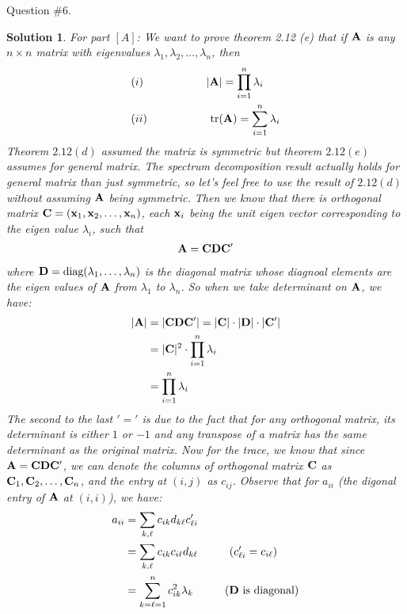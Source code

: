 \documentclass[11pt]{article}\usepackage[]{graphicx}\usepackage[]{color}
\newtheorem{sol}{Solution}
\begin{document}
Question $\# 6$.
\begin{sol}
	For part $[A]$:\vskip 2mm
	We want to prove theorem 2.12 (e) that if ${\bf A}$ is any $n \times n$ matrix with eigenvalues $\lambda_1, \lambda_2, \ldots, \lambda_n$, then 
	\begin{align*}
		&(i) \hskip 2cm |{\bf A}| = \prod_{i = 1}^n\lambda_i\\
		&(ii) \hskip 2cm \text{tr}({\bf A}) = \sum_{i = 1}^{n}\lambda_i
	\end{align*}
	Theorem $2.12(d)$ assumed the matrix is symmetric but theorem $2.12(e)$ assumes for general matrix. The spectrum decomposition result actually holds for general matrix than just symmetric, so let's feel free to use the result of $2.12(d)$ without assuming ${\bf A}$ being symmetric.\vskip 2mm
	Then we know that there is orthogonal matrix ${\bf C} = ({\bf x}_1, {\bf x}_2, \ldots, {\bf x}_n)$, each ${\bf x}_i$ being the unit eigen vector corresponding to the eigen value $\lambda_i$, such that
	\begin{align*}
		{\bf A} = {\bf C}{\bf D}{\bf C}'
	\end{align*}
	where ${\bf D} = \text{diag}(\lambda_1, \ldots, \lambda_n)$ is the diagonal matrix whose diagnoal elements are the eigen values of ${\bf A}$ from $\lambda_1$ to $\lambda_n$.\vskip 2mm
	So when we take determinant on ${\bf A}$, we have:
	\begin{align*}
		|{\bf A}| &= |{\bf C}{\bf D}{\bf C}'| = |{\bf C}|\cdot |{\bf D}|\cdot |{\bf C}'|\\
		&= |{\bf C}|^2\cdot \prod_{i = 1}^n\lambda_i\\
		&= \prod_{i = 1}^n\lambda_i
	\end{align*}
	The second to the last $'='$ is due to the fact that for any orthogonal matrix, its determinant is either $1$ or $-1$ and any transpose of a matrix has the same determinant as the original matrix.\vskip 2mm
	Now for the trace, we know that since ${\bf A} = {\bf C}{\bf D}{\bf C}'$, we can denote the columns of orthogonal matrix ${\bf C}$ as ${\bf C}_1, {\bf C}_2, \ldots, {\bf C}_n$, and the entry at $(i ,j)$ as $c_{ij}$. Observe that for $a_{ii}$ (the digonal entry of ${\bf A}$ at $(i, i)$), we have:
	\begin{align*}
		a_{ii} &= \sum_{k, \ell}c_{ik}d_{k\ell}c_{\ell i}'\\
				&= \sum_{k, \ell}c_{ik}c_{i\ell}d_{k\ell} \hskip 1cm (c_{\ell i}' = c_{i \ell})\\
				&= \sum_{k = \ell = 1}^n c_{ik}^2\lambda_k \hskip 1cm ({\bf D} \text{ is diagonal})\\

\end{align*}
\end{sol}
\end{document}
